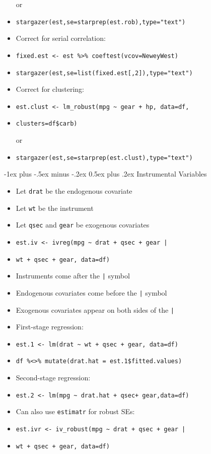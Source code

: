 \documentclass[10pt,landscape]{article}
\makeatletter
\renewcommand{\section}{\@startsection{section}{1}{0mm}%
                                {-1ex plus -.5ex minus -.2ex}%
                                {0.5ex plus .2ex}%
                                {\normalfont\large\bfseries}}
\makeatother
\begin{document}
\begin{multicols}{3}
\begin{itemize}
    or
    \item[] \verb!stargazer(est,se=starprep(est.rob),type="text")!
    \item Correct for serial correlation:
    \item[] \verb!fixed.est <- est %>% coeftest(vcov=NeweyWest)!
    \item[] \verb!stargazer(est,se=list(fixed.est[,2]),type="text")!
    \item Correct for clustering:
    \item[] \verb!est.clust <- lm_robust(mpg ~ gear + hp, data=df,!
    \item[] \verb!clusters=df$carb)!
    
    or
    \item[] \verb!stargazer(est,se=starprep(est.clust),type="text")!
\end{itemize}




\section{Instrumental Variables}

\smallskip{}

\begin{itemize}
    \item Let \verb!drat! be the endogenous covariate
    \item Let \verb!wt! be the instrument
    \item Let \verb!qsec! and \verb!gear! be exogenous covariates
    \item[] \verb!est.iv <- ivreg(mpg ~ drat + qsec + gear | !
    \item[] \verb!wt + qsec + gear, data=df)!
    \item Instruments come after the \verb!|! symbol
    \item Endogenous covariates come before the \verb!|! symbol
    \item Exogenous covariates appear on both sides of the \verb!|!
    \item First-stage regression:
    \item[] \verb!est.1 <- lm(drat ~ wt + qsec + gear, data=df)!
    \item[] \verb!df %<>% mutate(drat.hat = est.1$fitted.values)!
    \item Second-stage regression:
    \item[] \verb!est.2 <- lm(mpg ~ drat.hat + qsec+ gear,data=df)!
    \item Can also use \verb!estimatr! for robust SEs:
    \item[] \verb!est.ivr <- iv_robust(mpg ~ drat + qsec + gear | !
    \item[] \verb!wt + qsec + gear, data=df)!
\end{itemize}





\end{multicols}
\end{document}
